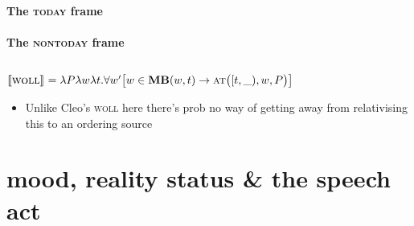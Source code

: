 \documentclass[11pt,dvipsnames]{report}
\providecommand{\denote}[2][]{\ensuremath{\llbracket{#2}\rrbracket^{#1}}}
\begin{document}
\paragraph{The \textsc{today} frame}

\paragraph{The \textsc{nontoday} frame}

\subsection{}




$ \denote{\textsc{woll}}=\lambda P\lambda w\lambda t.\forall w'\big[w\in\textbf{MB}(w,t)\to\textsc{at}\big([t,\_),w,P\big)\big] $
\begin{itemize}
	\item Unlike Cleo's \textsc{woll} here there's prob no way of getting away from relativising this to an ordering source
\end{itemize}

\clearpage\section{mood, reality status \& the speech act}\label{mood}
%
	
\end{document}
